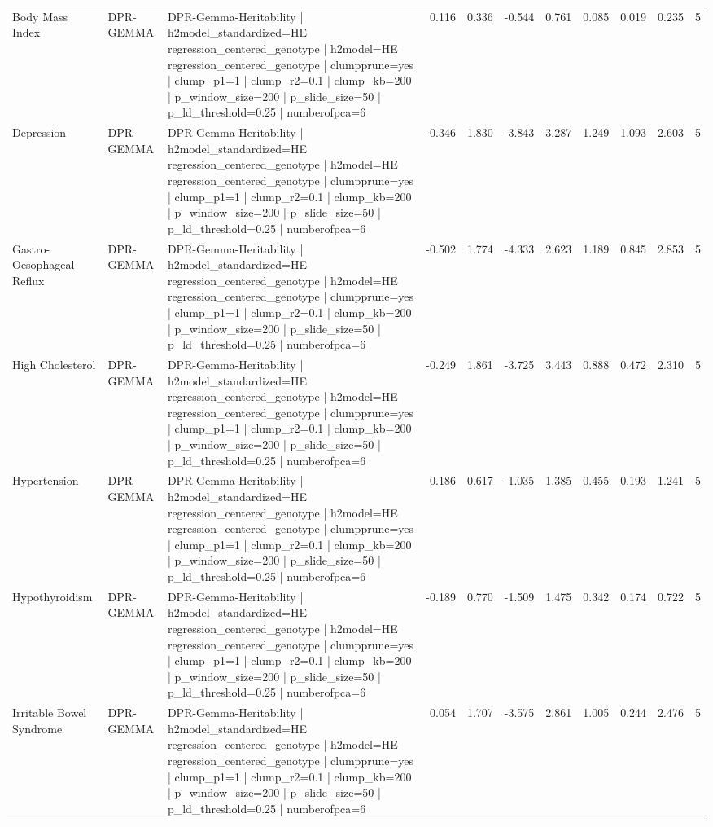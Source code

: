 \begin{landscape}
\begin{longtable}{p{2.4cm}p{1.8cm}p{6.0cm}rrrrrrrr}
Body Mass Index & DPR-GEMMA & DPR-Gemma-Heritability | h2model\_standardized=HE regression\_centered\_genotype | h2model=HE regression\_centered\_genotype | clumpprune=yes | clump\_p1=1 | clump\_r2=0.1 | clump\_kb=200 | p\_window\_size=200 | p\_slide\_size=50 | p\_ld\_threshold=0.25 | numberofpca=6 & 0.116 & 0.336 & -0.544 & 0.761 & 0.085 & 0.019 & 0.235 & 5 \\
Depression & DPR-GEMMA & DPR-Gemma-Heritability | h2model\_standardized=HE regression\_centered\_genotype | h2model=HE regression\_centered\_genotype | clumpprune=yes | clump\_p1=1 | clump\_r2=0.1 | clump\_kb=200 | p\_window\_size=200 | p\_slide\_size=50 | p\_ld\_threshold=0.25 | numberofpca=6 & -0.346 & 1.830 & -3.843 & 3.287 & 1.249 & 1.093 & 2.603 & 5 \\
Gastro-Oesophageal Reflux & DPR-GEMMA & DPR-Gemma-Heritability | h2model\_standardized=HE regression\_centered\_genotype | h2model=HE regression\_centered\_genotype | clumpprune=yes | clump\_p1=1 | clump\_r2=0.1 | clump\_kb=200 | p\_window\_size=200 | p\_slide\_size=50 | p\_ld\_threshold=0.25 | numberofpca=6 & -0.502 & 1.774 & -4.333 & 2.623 & 1.189 & 0.845 & 2.853 & 5 \\
High Cholesterol & DPR-GEMMA & DPR-Gemma-Heritability | h2model\_standardized=HE regression\_centered\_genotype | h2model=HE regression\_centered\_genotype | clumpprune=yes | clump\_p1=1 | clump\_r2=0.1 | clump\_kb=200 | p\_window\_size=200 | p\_slide\_size=50 | p\_ld\_threshold=0.25 | numberofpca=6 & -0.249 & 1.861 & -3.725 & 3.443 & 0.888 & 0.472 & 2.310 & 5 \\
Hypertension & DPR-GEMMA & DPR-Gemma-Heritability | h2model\_standardized=HE regression\_centered\_genotype | h2model=HE regression\_centered\_genotype | clumpprune=yes | clump\_p1=1 | clump\_r2=0.1 | clump\_kb=200 | p\_window\_size=200 | p\_slide\_size=50 | p\_ld\_threshold=0.25 | numberofpca=6 & 0.186 & 0.617 & -1.035 & 1.385 & 0.455 & 0.193 & 1.241 & 5 \\
Hypothyroidism & DPR-GEMMA & DPR-Gemma-Heritability | h2model\_standardized=HE regression\_centered\_genotype | h2model=HE regression\_centered\_genotype | clumpprune=yes | clump\_p1=1 | clump\_r2=0.1 | clump\_kb=200 | p\_window\_size=200 | p\_slide\_size=50 | p\_ld\_threshold=0.25 | numberofpca=6 & -0.189 & 0.770 & -1.509 & 1.475 & 0.342 & 0.174 & 0.722 & 5 \\
Irritable Bowel Syndrome & DPR-GEMMA & DPR-Gemma-Heritability | h2model\_standardized=HE regression\_centered\_genotype | h2model=HE regression\_centered\_genotype | clumpprune=yes | clump\_p1=1 | clump\_r2=0.1 | clump\_kb=200 | p\_window\_size=200 | p\_slide\_size=50 | p\_ld\_threshold=0.25 | numberofpca=6 & 0.054 & 1.707 & -3.575 & 2.861 & 1.005 & 0.244 & 2.476 & 5 \\

\end{longtable}
\end{landscape}
